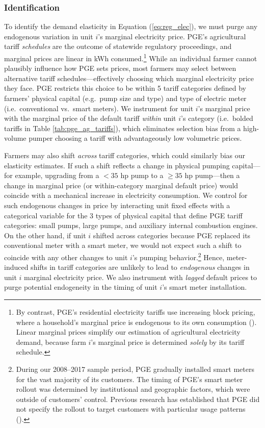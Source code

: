 \subsubsection{Identification}
To identify the demand elasticity in Equation (\ref{eq:reg_elec}), we must purge any endogenous variation in unit $i$'s marginal electricity price. PGE's agricultural tariff \emph{schedules} are the outcome of statewide regulatory proceedings, and marginal prices are linear in kWh consumed.\footnote{
By contrast, PGE's residential electricity tariffs use increasing block pricing, where a household's marginal price is endogenous to its own consumption (\textcite{ito2014}). Linear marginal prices simplify 
our estimation of agricultural electricity demand, because farm $i$'s marginal price is determined \emph{solely} by its tariff schedule. 
}
While an individual farmer cannot plausibly influence how PGE sets prices, most farmers may select between alternative tariff schedules---effectively choosing which marginal electricity price they face. PGE restricts this choice to be within 5 tariff categories defined by farmers' physical capital (e.g.\  pump size and type) and type of electric meter (i.e.\ conventional vs.\ smart meters). We instrument for unit $i$'s marginal price with the marginal price of the default tariff \emph{within} unit $i$'s category (i.e.\ bolded tariffs in Table \ref{tab:pge_ag_tariffs}), which eliminates selection bias from a high-volume pumper choosing a tariff with advantageously low volumetric prices.

Farmers may also shift \emph{across} tariff categories, which could similarly bias our elasticity estimates. If such a shift reflects a change in physical pumping capital---for example, upgrading from a $<35$ hp pump to a $\ge35$ hp pump---then a change in marginal price (or within-category marginal default price) would coincide with a mechanical increase in electricity consumption. We control for such endogenous changes in price by interacting unit fixed effects with a categorical variable for the 3 types of physical capital that define PGE tariff categories: small pumps, large pumps, and auxiliary internal combustion engines.
On the other hand, if unit $i$ shifted across categories because PGE replaced its conventional meter with a smart meter, we would not expect such a shift to coincide with any other changes to unit $i$'s pumping behavior.\footnote{
During our 2008--2017 sample period, PGE gradually installed smart meters for the vast majority of its customers. The timing of PGE's smart meter rollout was determined by institutional and geographic factors, which were outside of customers' control. Previous research has established that PGE did not specify the rollout to target customers with particular usage patterns (\textcite{blonz2016}).
}
Hence, meter-induced shifts in tariff categories are unlikely to lead to \emph{endogenous} changes in unit $i$ marginal electricity price. We also instrument with \emph{lagged} default prices to purge potential endogeneity in the timing of unit $i$'s smart meter installation.

